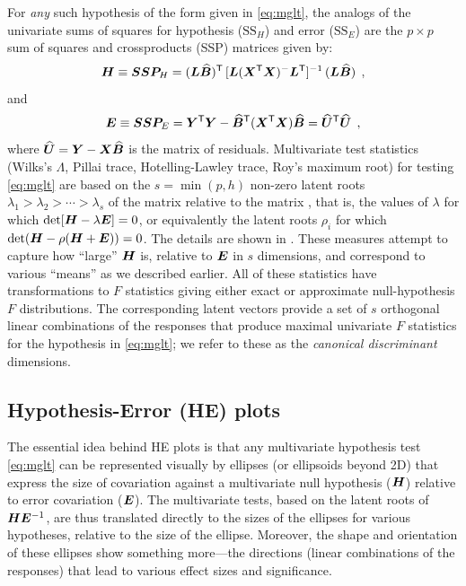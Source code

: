 For \emph{any} such hypothesis of the form given in \eqref{eq:mglt}, the analogs of the univariate
sums of squares for hypothesis ($\mathrm{SS}_H$) and error ($\mathrm{SS}_E$)
are the $p \times p$  sum of squares and crossproducts (SSP) matrices given by:
\begin{equation} \label{eq:hmat}
\bm{H}  \equiv \bm{SSP}_H =
 (\bm{L} \widehat{\bm{B}})^\mathsf{T} \,
 [\bm{L} (\bm{X}^\mathsf{T} \bm{X} )^{-} \bm{L}^\mathsf{T}]^{-1} \,
 (\bm{L} \widehat{\bm{B}})
 \:\: ,
\end{equation}
and
\begin{equation} \label{eq:emat}
\bm{E}  \equiv \bm{SSP}_E =
 \bm{Y}^\mathsf{T} \bm{Y} -
 \widehat{\bm{B}}^\mathsf{T} (\bm{X}^\mathsf{T} \bm{X}) \widehat{\bm{B}}
 =
  \widehat{\bm{U}}^\mathsf{T}  \widehat{\bm{U}}
 \:\: ,
\end{equation}
where $\widehat{\bm{U}} = \bm{Y} - \bm{X} \widehat{\bm{B}}$ is the matrix of residuals.
Multivariate test statistics (Wilks's $\Lambda$, Pillai trace, Hotelling-Lawley trace, Roy's maximum root)
for testing \eqref{eq:mglt} are based on the $s = \min(p, h)$ non-zero latent roots
$\lambda_{1}>\lambda_{2}>\cdots>\lambda_{s}$ of
the matrix  relative to the matrix , that is,
the values of $\lambda$ for which $
\mathrm{det} [\bm{H}-\lambda\bm{E}]=0$, or equivalently
the latent roots $\rho_i$ for which $\mathrm{det} (\bm{H} - \rho (\bm{H}+\bm{E}))=0$.
The details are shown in .
These measures
attempt to capture how ``large'' $\bm{H}$ is, relative to
$\bm{E}$ in $s$ dimensions, and correspond to various ``means'' as we described earlier.
All of these statistics have transformations to $F$ statistics
giving either exact or approximate null-hypothesis $F$ distributions.
The corresponding latent vectors provide a
set of $s$ orthogonal linear combinations of the responses that produce
maximal univariate $F$ statistics for the hypothesis in \eqref{eq:mglt};
we refer to these as the \emph{canonical discriminant} dimensions.



\subsection{Hypothesis-Error (HE) plots}

The essential idea behind HE plots is that any multivariate hypothesis
test \eqref{eq:mglt} can be represented visually by ellipses (or ellipsoids beyond 2D) that express
the size  of covariation against a multivariate null hypothesis
($\bm{H}$) relative to error covariation ($\bm{E}$).
The multivariate tests, based on the latent roots of $\bm{H} \bm{E}^{-1}$,
are thus translated directly to the sizes of the  ellipses for
various hypotheses, relative to the size of the  ellipse.
Moreover, the shape and orientation of these ellipses show something more---the
directions (linear combinations of the responses) that lead to
various effect sizes and significance.

